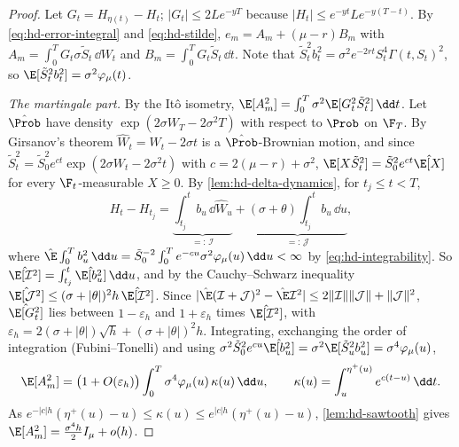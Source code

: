 \begin{proof}
Let $G_t=H_{\eta(t)}-H_t$; $|G_t|\le2Le^{-yT}$ because $|H_t|\le e^{-yt}Le^{-y(T-t)}$. By
\eqref{eq:hd-error-integral} and \eqref{eq:hd-stilde}, $e_m=A_m+(\mu-r)B_m$ with
$A_m=\int_0^TG_t\sigma\tilde S_t\,\dd W_t$ and $B_m=\int_0^TG_t\tilde S_t\,\dd t$. Note that
$\tilde S_t^2b_t^2=\sigma^2e^{-2rt}S_t^4\Gamma(t,S_t)^2$, so $\E[\tilde S_t^2b_t^2]=\sigma^2\varphi_\mu(t)$.

\emph{The martingale part.} By the It\^o isometry,
$\E[A_m^2]=\int_0^T\sigma^2\E[G_t^2\tilde S_t^2]\,\dd t$. Let $\hat\Prob$ have density
$\exp(2\sigma W_T-2\sigma^2T)$ with respect to $\Prob$ on $\F_T$. By Girsanov's theorem
$\hat W_t=W_t-2\sigma t$ is a $\hat\Prob$-Brownian motion, and since
$\tilde S_t^2=\tilde S_0^2e^{ct}\exp(2\sigma W_t-2\sigma^2t)$ with $c=2(\mu-r)+\sigma^2$,
$\E[X\tilde S_t^2]=\tilde S_0^2e^{ct}\hat\E[X]$ for every $\F_t$-measurable $X\ge0$. By
\cref{lem:hd-delta-dynamics}, for $t_j\le t<T$,
\[
  H_t-H_{t_j}=\underbrace{\int_{t_j}^tb_u\,\dd\hat W_u}_{=:\,\mathcal I}
  +\underbrace{(\sigma+\theta)\int_{t_j}^tb_u\,\dd u}_{=:\,\mathcal J},
\]
where $\hat\E\int_0^Tb_u^2\,\dd u=\tilde S_0^{-2}\int_0^Te^{-cu}\sigma^2\varphi_\mu(u)\,\dd u<\infty$ by
\eqref{eq:hd-integrability}. So $\hat\E[\mathcal I^2]=\int_{t_j}^t\hat\E[b_u^2]\,\dd u$, and by the
Cauchy--Schwarz inequality $\hat\E[\mathcal J^2]\le(\sigma+|\theta|)^2h\,\hat\E[\mathcal I^2]$. Since
$|\hat\E(\mathcal I+\mathcal J)^2-\hat\E\mathcal I^2|\le2\|\mathcal I\|\|\mathcal J\|+\|\mathcal J\|^2$,
$\hat\E[G_t^2]$ lies between $1-\varepsilon_h$ and $1+\varepsilon_h$ times $\hat\E[\mathcal I^2]$, with
$\varepsilon_h=2(\sigma+|\theta|)\sqrt h+(\sigma+|\theta|)^2h$. Integrating, exchanging the order of
integration (Fubini--Tonelli) and using $\sigma^2\tilde S_0^2e^{cu}\hat\E[b_u^2]=\sigma^2\E[\tilde S_u^2b_u^2]=\sigma^4\varphi_\mu(u)$,
\[
  \E[A_m^2]=\big(1+O(\varepsilon_h)\big)\int_0^T\sigma^4\varphi_\mu(u)\,\kappa(u)\,\dd u,\qquad
  \kappa(u)=\int_u^{\eta^+(u)}e^{c(t-u)}\,\dd t .
\]
As $e^{-|c|h}(\eta^+(u)-u)\le\kappa(u)\le e^{|c|h}(\eta^+(u)-u)$, \cref{lem:hd-sawtooth} gives
$\E[A_m^2]=\frac{\sigma^4h}2I_\mu+o(h)$.


\end{proof}
